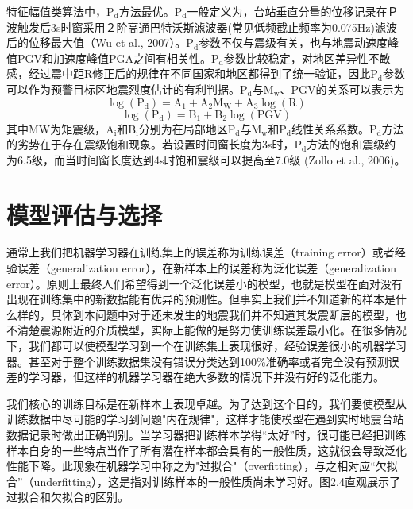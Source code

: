  \indent 特征幅值类算法中，$\mathrm{P}_{\mathrm{d}}$方法最优。$\mathrm{P}_{\mathrm{d}}$一般定义为，台站垂直分量的位移记录在Ｐ波触发后3s时窗采用２阶高通巴特沃斯滤波器(常见低频截止频率为0.075Hz)滤波后的位移最大值（Wu et al., 2007）。$\mathrm{P}_{\mathrm{d}}$参数不仅与震级有关，也与地震动速度峰值PGV和加速度峰值PGA之间有相关性。$\mathrm{P}_{\mathrm{d}}$参数比较稳定，对地区差异性不敏感，经过震中距R修正后的规律在不同国家和地区都得到了统一验证，因此$\mathrm{P}_{\mathrm{d}}$参数可以作为预警目标区地震烈度估计的有利判据。$\mathrm{P}_{\mathrm{d}}$与$\mathrm{M}_{\mathrm{w}}$、PGV的关系可以表示为
\begin{equation}
\log \left(\mathrm{P}_{\mathrm{d}}\right)=\mathrm{A}_{1}+\mathrm{A}_{2} \mathrm{M}_{\mathrm{W}}+\mathrm{A}_{3} \log (\mathrm{R})
\end{equation}
 \begin{equation}
\log \left(\mathrm{P}_{\mathrm{d}}\right)=\mathrm{B}_{1}+\mathrm{B}_{2} \log (\mathrm{PGV})
\end{equation}
 其中MW为矩震级，$\mathrm{A}_{\mathrm{i}}$和$\mathrm{B}_{\mathrm{i}}$分别为在局部地区$\mathrm{P}_{\mathrm{d}}$与$\mathrm{M}_{\mathrm{w}}$和$\mathrm{P}_{\mathrm{d}}$线性关系系数。$\mathrm{P}_{\mathrm{d}}$方法的劣势在于存在震级饱和现象。若设置时间窗长度为3s时，$\mathrm{P}_{\mathrm{d}}$方法的饱和震级约为6.5级，而当时间窗长度达到4s时饱和震级可以提高至7.0级 (Zollo et al., 2006)。
 
 
 
\section{模型评估与选择}

 \indent 通常上我们把机器学习器在训练集上的误差称为训练误差（training error）或者经验误差（generalization error），在新样本上的误差称为泛化误差（generalization error）。原则上最终人们希望得到一个泛化误差小的模型，也就是模型在面对没有出现在训练集中的新数据能有优异的预测性。但事实上我们并不知道新的样本是什么样的，具体到本问题中对于还未发生的地震我们并不知道其发震断层的模型，也不清楚震源附近的介质模型，实际上能做的是努力使训练误差最小化。在很多情况下，我们都可以使模型学习到一个在训练集上表现很好，经验误差很小的机器学习器。甚至对于整个训练数据集没有错误分类达到100\%准确率或者完全没有预测误差的学习器，但这样的机器学习器在绝大多数的情况下并没有好的泛化能力。
 
 \indent 我们核心的训练目标是在新样本上表现卓越。为了达到这个目的，我们要使模型从训练数据中尽可能的学习到问题"内在规律"，这样才能使模型在遇到实时地震台站数据记录时做出正确判别。当学习器把训练样本学得“太好”时，很可能已经把训练样本自身的一些特点当作了所有潜在样本都会具有的一般性质，这就很会导致泛化性能下降。此现象在机器学习中称之为"过拟合"（overfitting），与之相对应“欠拟合”（underfitting），这是指对训练样本的一般性质尚未学习好。图2.4直观展示了过拟合和欠拟合的区别。
 
